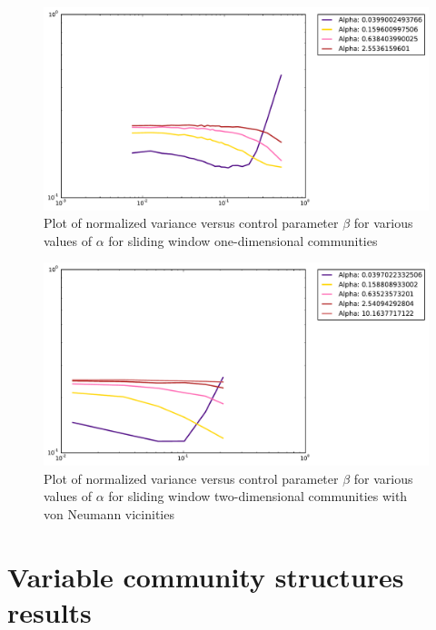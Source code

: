 \begin{figure}[h]
\begin{center}
\includegraphics[scale=0.4]{images/results/vicinity_sliding_n401_rounds10000_partial.pdf}
\caption{Plot of normalized variance versus control parameter $\beta$ for various values of $\alpha$  for sliding window one-dimensional communities}
\label{fig:sliding vicinity partial}
\end{center}
\end{figure}

\begin{figure}[h]
\begin{center}
\includegraphics[scale=0.4]{images/results/vicinity_vonNeumann_n403_rounds10000_partial.pdf}
\caption{Plot of normalized variance versus control parameter $\beta$ for various values of $\alpha$  for sliding window two-dimensional communities with von Neumann vicinities}
\label{fig:von neumann vicinity partial}
\end{center}
\end{figure}


\section{Variable community structures results}
\label{sec:hierarchical}

